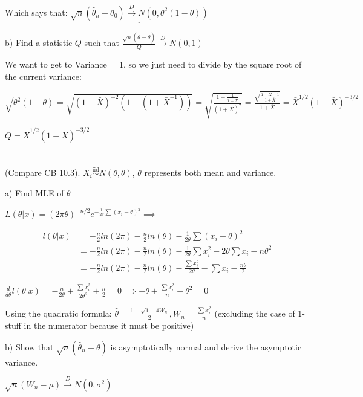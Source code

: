 \documentclass{article}
\newcommand{\dto}{\overset{D}{\to}}
\let\Oldsum=\sum
\renewcommand{\sum}{\Oldsum\limits}
\newcommand{\iiddist}{\overset{\mathrm{iid}}{\sim}}
\begin{document}
Which says that: $\underline{\sqrt{n}(\hat{\theta}_n - \theta_0) \dto N(0, \theta^2(1-\theta))}$

b) Find a statistic $Q$ such that $\frac{\sqrt{n}(\hat{\theta} - \theta)}{Q} \dto N(0, 1)$

We want to get to Variance = 1, so we just need to divide by the square root of the current variance: 

$\sqrt{\theta^2(1-\theta)} = \sqrt{(1 + \bar{X})^{-2}(1 - (1 + \bar{X}^{-1}))} = \sqrt{\frac{1 - \frac{1}{1 + \bar{X}}}{(1 + \bar{X})^2}} = \frac{\sqrt{\frac{1 + \bar{X} - 1}{1 + \bar{X}}}}{1 + \bar{X}} = \bar{X}^{1/2}(1 + \bar{X})^{-3/2}$

$Q = \bar{X}^{1/2}(1 + \bar{X})^{-3/2}$


\section{}

(Compare CB 10.3). $X_i \iiddist N(\theta, \theta)$, $\theta$ represents both mean and variance. 

a) Find MLE of $\theta$

$L(\theta|x) = (2\pi\theta)^{-n/2}e^{-\frac{1}{2\theta}\sum(x_i - \theta)^2} \implies $

$$
\begin{aligned}
l(\theta|x) 
& = -\frac{n}{2}ln(2\pi) - \frac{n}{2}ln(\theta) - \frac{1}{2\theta}\sum(x_i - \theta)^2 \\
& = -\frac{n}{2}ln(2\pi) - \frac{n}{2}ln(\theta) - \frac{1}{2\theta}\sum x_i^2 - 2\theta \sum x_i - n\theta^2 \\
& = -\frac{n}{2}ln(2\pi) - \frac{n}{2}ln(\theta) - \frac{\sum x_i^2}{2\theta} - \sum x_i - \frac{n\theta}{2}
\end{aligned}
$$

$\frac{d}{d\theta}l(\theta|x) = -\frac{n}{2\theta} + \frac{\sum x_i^2}{2\theta^2} + \frac{n}{2} = 0 \implies -\theta + \frac{\sum x_i^2}{n} - \theta^2 = 0$

Using the quadratic formula: $\hat{\theta} = \frac{1 + \sqrt{1 + 4W_n}}{2}, W_n = \frac{\sum x_i^2}{n}$ (excluding the case of 1-stuff in the numerator because it must be positive)

b) Show that $\sqrt{n}(\hat{\theta}_n - \theta)$ is asymptotically normal and derive the asymptotic variance. 

$\sqrt{n}(W_n - \mu) \dto N(0, \sigma^2)$
\end{document}

